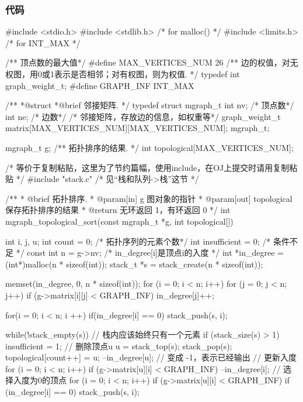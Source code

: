 \subsubsection{代码}
\begin{Codex}[label=poj_1094.c]
#include <stdio.h>
#include <stdlib.h>  /* for malloc() */
#include <limits.h>  /* for INT_MAX */

/** 顶点数的最大值*/
#define MAX_VERTICES_NUM 26
/** 边的权值，对无权图，用0或1表示是否相邻；对有权图，则为权值. */
typedef int graph_weight_t;
#define GRAPH_INF INT_MAX

/**
 *@struct
 *@brief 邻接矩阵.
 */
typedef struct mgraph_t {
    int nv; /* 顶点数*/
    int ne; /* 边数*/
    /* 邻接矩阵，存放边的信息，如权重等*/
    graph_weight_t matrix[MAX_VERTICES_NUM][MAX_VERTICES_NUM];
} mgraph_t;

mgraph_t g;
/** 拓扑排序的结果. */
int topological[MAX_VERTICES_NUM];

/* 等价于复制粘贴，这里为了节约篇幅，使用include，在OJ上提交时请用复制粘贴 */
#include "stack.c"  /* 见“栈和队列->栈”这节 */

/**
  * @brief 拓扑排序.
  * @param[in] g 图对象的指针
  * @param[out] topological 保存拓扑排序的结果
  * @return 无环返回 1，有环返回 0
  */
int mgraph_topological_sort(const mgraph_t *g, int topological[]) {
    int i, j, u;
    int count = 0; /* 拓扑序列的元素个数*/
    int insufficient = 0;  /* 条件不足 */
    const int n = g->nv;
    /* in_degree[i]是顶点i的入度 */
    int *in_degree = (int*)malloc(n * sizeof(int));
    stack_t *s = stack_create(n * sizeof(int));

    memset(in_degree, 0, n * sizeof(int));
    for (i = 0; i < n; i++) {
        for (j = 0; j < n; j++) {
            if (g->matrix[i][j] < GRAPH_INF)
                in_degree[j]++;
        }
    }

    for(i = 0; i < n; i ++) {
        if(in_degree[i] == 0) {
            stack_push(s, i);
        }
    }

    while(!stack_empty(s)) {
        // 栈内应该始终只有一个元素
        if (stack_size(s) > 1) insufficient = 1;
        // 删除顶点u
        u = stack_top(s); stack_pop(s);
        topological[count++] = u;
        --in_degree[u];  // 变成 -1，表示已经输出
        // 更新入度
        for (i = 0; i < n; i++) if (g->matrix[u][i] < GRAPH_INF) {
            --in_degree[i];
        }
        // 选择入度为0的顶点
        for (i = 0; i < n; i++) if (g->matrix[u][i] < GRAPH_INF) {
            if (in_degree[i] == 0) stack_push(s, i);
        }
    }

}
\end{Codex}
